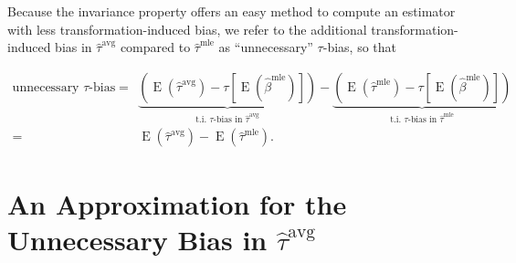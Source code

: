 \documentclass[11pt]{article}
\DeclareMathOperator*{\E}{\text{E}}
\begin{document}
Because the invariance property offers an easy method to compute an estimator with less transformation-induced bias, we refer to the additional transformation-induced bias in $\hat{\tau}^\text{avg}$ compared to $\hat{\tau}^\text{mle}$ as ``unnecessary'' $\tau$-bias, so that 

\begin{align*}
\text{unnecessary } \tau\text{-bias} =& \underbrace{ \left( \E \left( \hat{\tau}^\text{avg}\right) - \tau \left[\E \left( \hat{\beta}^\text{mle} \right) \right] \right) }_{\text{t.i. } \tau\text{-bias in }\hat{\tau}^{\text{avg}}} - \underbrace{ \left( \E \left( \hat{\tau}^\text{mle}\right) -  \tau \left[\E \left( \hat{\beta}^\text{mle} \right) \right] \right) }_{\text{t.i. } \tau\text{-bias in }\hat{\tau}^{\text{mle}}} \\
 =& \E \left( \hat{\tau}^\text{avg}\right) - \E \left( \hat{\tau}^\text{mle}\right) .
\end{align*}

\section*{An Approximation for the Unnecessary Bias in $\hat{\tau}^\text{avg}$}
\end{document}
